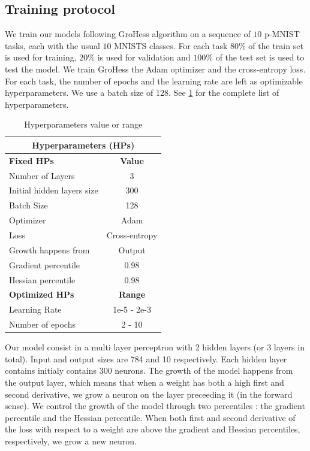 \documentclass[twocolumn]{article}
\begin{document}
\subsection{Training protocol}


We train our models following GroHess algorithm on a sequence of $10$ p-MNIST tasks, each with the usual $10$ MNISTS classes. For each task $80\%$ of the train set is used for training, $20\%$ is used for validation and $100\%$ of the test set is used to test the model. We train GroHess the Adam optimizer and the cross-entropy loss. For each task, the number of epochs and the learning rate are left as optimizable hyperparameters. We use a batch size of $128$. See \ref{table:HPs} for the complete list of hyperparameters.


\begin{table}[h!]
    \centering
    \begin{tabular}{|l|c|}
    \hline
    \multicolumn{2}{|c|}{\textbf{Hyperparameters (HPs)}} \\
    \hline
    \textbf{Fixed HPs} & \textbf{Value}\\
    \hline
    Number of Layers & 3 \\
    Initial hidden layers size & 300 \\
    Batch Size & 128 \\
    Optimizer & Adam \\
    Loss & Cross-entropy \\
    Growth happens from & Output \\
    Gradient percentile & 0.98 \\
    Hessian percentile & 0.98 \\
    \hline
    \hline
    \textbf{Optimized HPs} & \textbf{Range}\\
    \hline
    Learning Rate & 1e-5 - 2e-3 \\
    Number of epochs & 2 - 10 \\
    \hline
    \end{tabular}
    \caption{Hyperparameters value or range}
    \label{table:HPs}
\end{table}

Our model consist in a multi layer perceptron with 2 hidden layers (or 3 layers in total). Input and output sizes are 784 and 10 respectively. Each hidden layer contains initialy contains 300 neurons. The growth of the model happens from the output layer, which means that when a weight has both a high first and second derivative, we grow a neuron on the layer preceeding it (in the forward sense). We control the growth of the model through two percentiles : the gradient percentile and the Hessian percentile. When both first and second derivative of the loss with respect to a weight are above the gradient and Hessian percentiles, respectively, we grow a new neuron. 
\end{document}
